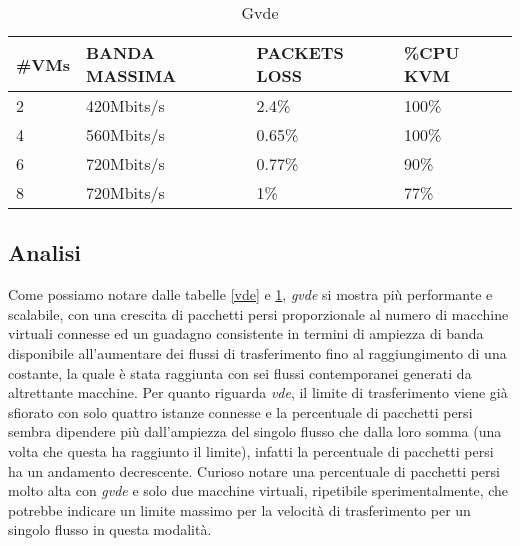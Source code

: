 \begin{table}[h]
\begin{tabular}{|p{}|p{}|p{}|p{}|}
\hline
\#VMs    & BANDA MASSIMA       & PACKETS LOSS   & \%CPU KVM \\
\hline
\hline
2       & 420Mbits/s         & 2.4\%   & 100\% \\
\hline
4       & 560Mbits/s         & 0.65\%   & 100\% \\
\hline
6       & 720Mbits/s         & 0.77\%  & 90\% \\
\hline
8       & 720Mbits/s         & 1\%  & 77\% \\
\hline
\end{tabular}
\caption{Gvde}
\label{gvde}
\end{table}
\subsection{Analisi}
Come possiamo notare dalle tabelle {\ref{vde}} e {\ref{gvde}}, {\em gvde} si mostra più performante e scalabile, con una crescita di pacchetti persi proporzionale al numero di macchine virtuali connesse ed un guadagno consistente in termini di ampiezza di banda disponibile all'aumentare dei flussi di trasferimento fino al raggiungimento di una costante, la quale è stata raggiunta con sei flussi contemporanei generati da altrettante macchine. Per quanto riguarda {\em vde}, il limite di trasferimento viene già sfiorato con solo quattro istanze connesse e la percentuale di pacchetti persi sembra dipendere più dall'ampiezza del singolo flusso che dalla loro somma (una volta che questa ha raggiunto il limite), infatti la percentuale di pacchetti persi ha un andamento decrescente. Curioso notare una percentuale di pacchetti persi molto alta con {\em gvde} e solo due macchine virtuali, ripetibile sperimentalmente, che potrebbe indicare un limite massimo per la velocità di trasferimento per un singolo flusso in questa modalità.
